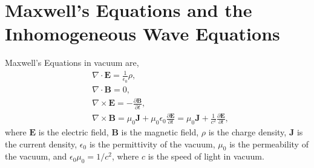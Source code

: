 \documentclass[11pt]{article}              %
\begin{document}
%

\section{Maxwell's Equations and the Inhomogeneous Wave Equations}\label{section2.1} %
Maxwell's Equations in vacuum are,
\begin{align}
    &\nabla\cdot{\mathbf E}=\frac{1}{\epsilon_0}\rho,\label{eqn:maxwell1}\\
    &\nabla\cdot{\mathbf B}=0,\label{eqn:maxwell2}\\
    &\nabla\times{\mathbf E}=-\frac{\partial {\mathbf B}}{\partial t},\label{eqn:maxwell3}\\
    &\nabla\times{\mathbf B}=\mu_0{\mathbf J}+\mu_0\epsilon_0\frac{\partial {\mathbf E}}{\partial t}=\mu_0{\mathbf J}+\frac{1}{c^2}\frac{\partial {\mathbf E}}{\partial t},\label{eqn:maxwell4}
\end{align}
where $\mathbf E$ is the electric field, $\mathbf B$ is the magnetic field, $\rho$ is the charge density, ${\mathbf J}$ is the current density, $\epsilon_0$ is the permittivity of the vacuum,  $\mu_0$ is the permeability of the vacuum, and $\epsilon_0\mu_0=1/c^2$, where $c$ is the speed of light in vacuum.
\end{document}

